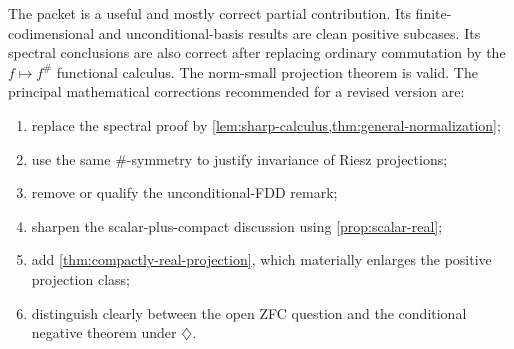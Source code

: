 \documentclass[11pt]{article}
\theoremstyle{definition}
\theoremstyle{remark}
\begin{document}
The packet is a useful and mostly correct partial contribution. Its finite-codimensional and unconditional-basis results are clean positive subcases. Its spectral conclusions are also correct after replacing ordinary commutation by the $f\mapsto f^{\#}$ functional calculus. The norm-small projection theorem is valid. The principal mathematical corrections recommended for a revised version are:

\begin{enumerate}[label=\arabic*.,leftmargin=2em]
\item replace the spectral proof by \cref{lem:sharp-calculus,thm:general-normalization};
\item use the same $\#$-symmetry to justify invariance of Riesz projections;
\item remove or qualify the unconditional-FDD remark;
\item sharpen the scalar-plus-compact discussion using \cref{prop:scalar-real};
\item add \cref{thm:compactly-real-projection}, which materially enlarges the positive projection class;
\item distinguish clearly between the open ZFC question and the conditional negative theorem under $\diamondsuit$.
\end{enumerate}
\end{document}
